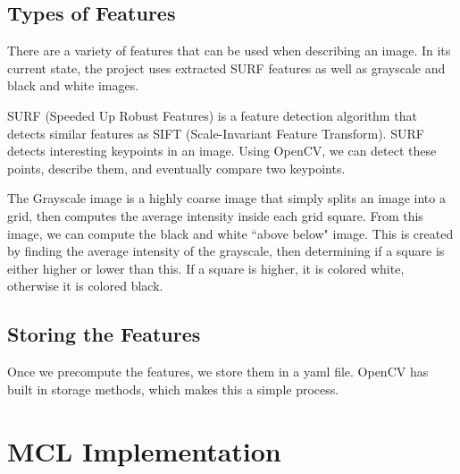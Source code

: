 \documentclass[a4paper,11pt]{article}
\begin{document}
  \subsection{Types of Features}
There are a variety of features that can be used when describing an image. In its current state, the project uses extracted SURF features as well as grayscale and black and white images.

SURF (Speeded Up Robust Features) is a feature detection algorithm that detects similar features as SIFT (Scale-Invariant Feature Transform). SURF detects interesting keypoints in an image. Using OpenCV, we can detect these points, describe them, and eventually compare two keypoints.

The Grayscale image is a highly coarse image that simply splits an image into a grid, then computes the average intensity inside each grid square. From this image, we can compute the black and white ``above below" image. This is created by finding the average intensity of the grayscale, then determining if a square is either higher or lower than this. If a square is higher, it is colored white, otherwise it is colored black.

  \subsection{Storing the Features}
Once we precompute the features, we store them in a yaml file. OpenCV has built in storage methods, which makes this a simple process.








  \section{MCL Implementation}
   
  








  
\end{document}
